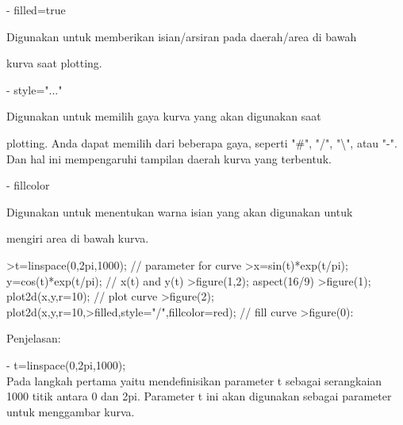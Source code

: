 \documentclass[a4paper,10pt]{article}
\begin{document}
\begin{eulernotebook}
\begin{eulercomment}
\begin{eulercomment}
\begin{eulercomment}
\begin{eulercomment}
\begin{eulercomment}
\begin{eulercomment}
\begin{eulercomment}
\begin{eulercomment}
\begin{eulercomment}
\begin{eulercomment}
\begin{eulercomment}
\begin{eulercomment}
\begin{eulercomment}
- filled=true\\
\end{eulercomment}
\begin{eulerttcomment}
  Digunakan untuk memberikan isian/arsiran pada daerah/area di bawah
\end{eulerttcomment}
\begin{eulercomment}
kurva saat plotting.

- style="..."\\
\end{eulercomment}
\begin{eulerttcomment}
  Digunakan untuk memilih gaya kurva yang akan digunakan saat
\end{eulerttcomment}
\begin{eulercomment}
plotting. Anda dapat memilih dari beberapa gaya, seperti "#", "/",
"\textbackslash{}", atau "-". Dan hal ini mempengaruhi tampilan daerah kurva yang
terbentuk.

- fillcolor\\
\end{eulercomment}
\begin{eulerttcomment}
  Digunakan untuk menentukan warna isian yang akan digunakan untuk
\end{eulerttcomment}
\begin{eulercomment}
mengiri area di bawah kurva.

\end{eulercomment}
\begin{eulerprompt}
>t=linspace(0,2pi,1000); // parameter for curve
>x=sin(t)*exp(t/pi); y=cos(t)*exp(t/pi); // x(t) and y(t)
>figure(1,2); aspect(16/9)
>figure(1); plot2d(x,y,r=10); // plot curve
>figure(2); plot2d(x,y,r=10,>filled,style="/",fillcolor=red); // fill curve
>figure(0):
\end{eulerprompt}
\begin{eulercomment}
Penjelasan:

- t=linspace(0,2pi,1000);\\
Pada langkah pertama yaitu mendefinisikan parameter t sebagai
serangkaian 1000 titik antara 0 dan 2pi. Parameter t ini akan
digunakan sebagai parameter untuk menggambar kurva.


\end{eulercomment}
\end{eulercomment}
\end{eulercomment}
\end{eulercomment}
\end{eulercomment}
\end{eulercomment}
\end{eulercomment}
\end{eulercomment}
\end{eulercomment}
\end{eulercomment}
\end{eulercomment}
\end{eulercomment}
\end{eulercomment}
\end{eulernotebook}
\end{document}
